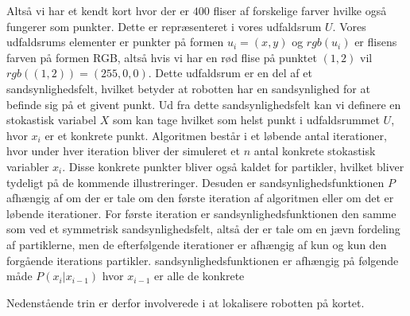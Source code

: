 \documentclass[../../SRP.tex]{subfiles}
\begin{document}
Altså vi har et kendt kort hvor der er $400$ fliser af forskelige farver hvilke også fungerer som punkter. Dette er repræsenteret i vores udfaldsrum $U$. Vores udfaldsrums elementer er punkter på formen $u_i = (x,y)$ og $rgb(u_i)$ er flisens farven på formen RGB, altså hvis vi har en rød flise på punktet $(1,2)$ vil $rgb((1,2)) = (255,0,0)$. Dette udfaldsrum er en del af et sandsynlighedsfelt, hvilket betyder at robotten har en sandsynlighed for at befinde sig på et givent punkt. Ud fra dette sandsynlighedsfelt kan vi definere en stokastisk variabel $X$ som kan tage hvilket som helst punkt i udfaldsrummet $U$, hvor $x_i$ er et konkrete punkt. Algoritmen består i et løbende antal iterationer, hvor under hver iteration bliver der simuleret et $n$ antal konkrete stokastisk variabler $x_i$. Disse konkrete punkter bliver også kaldet for partikler, hvilket bliver tydeligt på de kommende illustreringer. Desuden er sandsynlighedsfunktionen $P$ afhængig af om der er tale om den første iteration af algoritmen eller om det er løbende iterationer. For første iteration er sandsynlighedsfunktionen den samme som ved et symmetrisk sandsynlighedsfelt, altså der er tale om en jævn fordeling af partiklerne, men de efterfølgende iterationer er afhængig af kun og kun den forgående iterations partikler. sandsynlighedsfunktionen er afhængig på følgende måde $P(x_i|x_{i-1})$ hvor $x_{i-1}$ er alle de konkrete 

Nedenstående trin er derfor involverede i at lokalisere robotten på kortet.
\end{document}
